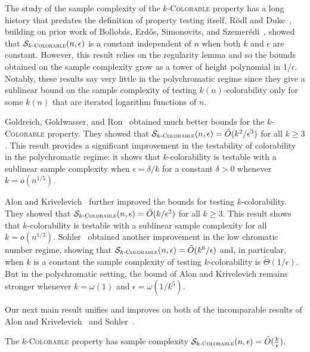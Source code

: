 \documentclass[11pt]{article}
\begin{document}
The study of the sample complexity of the \textsc{$k$-Colorable} property has a long history that predates the definition of property testing itself.  R\"odl and Duke~\cite{RodlDuke85}, building on prior work of Bollob\'as, Erd\H os, Simonovits, and Szemer\'edi~\cite{BollobasESS78}, showed that $\mathcal{S}_{k\textsc{-Colorable}}(n,\epsilon)$ is a constant independent of $n$ when both $k$ and $\epsilon$ are constant. However, this result relies on the regularity lemma and so the bounds obtained on the sample complexity grow as a tower of height polynomial in $1/\epsilon$. Notably, these results say very little in the polychromatic regime since they give a sublinear bound on the sample complexity of testing $k(n)$-colorability only for some $k(n)$ that are iterated logarithm functions of $n$.

Goldreich, Goldwasser, and Ron~\cite{goldreichPropertyTesting1998} obtained much better bounds for the \textsc{$k$-Colorable} property. 
They showed that $\mathcal{S}_{k\textsc{-Colorable}}(n,\epsilon) = \tilde{O}(k^2/\epsilon^{3})$ for all $k \ge 3$. This result provides a significant improvement in the testability of colorability in the polychromatic regime: it shows that $k$-colorability is testable with a sublinear sample complexity when $\epsilon = \delta/k$ for a constant $\delta > 0$ whenever $k = o(n^{1/5})$.

Alon and Krivelevich~\cite{AlonKrivelevich02} further improved the bounds for testing $k$-colorability. They showed that $\mathcal{S}_{k\textsc{-Colorable}}(n,\epsilon) = \tilde{O}(k/\epsilon^{2})$ for all $k \ge 3$. This result shows that $k$-colorability is testable with a sublinear sample complexity for all $k = o(n^{1/3})$.
Sohler~\cite{Sohler12} obtained another improvement in the low chromatic number regime, showing that  $\mathcal{S}_{k\textsc{-Colorable}}(n,\epsilon) = \tilde{O}(k^6/\epsilon)$ and, in particular, when $k$ is a constant the sample complexity of testing $k$-colorability is $\tilde{\Theta}(1/\epsilon)$. But in the polychromatic setting, the bound of Alon and Krivelevich remains stronger whenever $k = \omega(1)$ and $\epsilon = \omega(1/k^5)$.

Our next main result unifies and improves on both of the incomparable results of Alon and Krivelevich~\cite{AlonKrivelevich02} and Sohler~\cite{Sohler12}.

\begin{theorem}
\label{thm:k-col}
The \textsc{$k$-Colorable} property has sample complexity $\mathcal{S}_{k\textsc{-Colorable}}(n,\epsilon) = \tilde{O}(\frac{k}{\epsilon})$.
\end{theorem}
\end{document}
